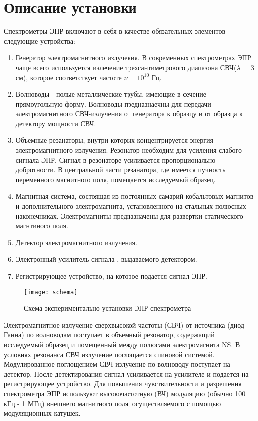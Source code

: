 \documentclass[a4paper,12pt]{article}
\begin{document}
	\section{Описание установки}
	
	Спектрометры ЭПР включают в себя в качестве обязательных элементов следующие устройства:

	\begin{enumerate}
	\item Генератор электромагнитного излучения. В современных спектрометрах ЭПР чаще всего используется излечение трехсантиметрового диапазона СВЧ($\lambda$ = 3 см), которое соответствует частоте $\nu$ = $10^{10}$ Гц.
	\item Волноводы - полые металлические трубы, имеющие в сечение прямоугольную форму. Волноводы предназнаечны для передачи электромагнитного СВЧ-излучения от генератора к образцу и от образца к детектору мощности СВЧ. 
	\item Объемные резанаторы, внутри которых концентрируется энергия электромагнитного излучения. Резонатор  необходим  для  усиления  слабого  сигнала  ЭПР.  Сигнал  в резонаторе  усиливается  пропорционально  добротности. В центральной части резанатора, где имеется пучность переменного магнитного поля, помещается исследуемый образец. 
	\item Магнитная система, состоящая из постоянных самарий-кобальтовых магнитов  и дополнительного электромагнита, установленного на стальных полюсных наконечниках. Электромагниты предназначены для развертки статического магнтиного поля. 
	\item Детектор электромагнитного излучения.
	\item Электронный усилитель сигнала , выдаваемого детектором.
	\item Регистрирующее устройство, на которое подается сигнал ЭПР. 
	\end{enumerate}
	
	\begin{figure}[h!]
		\begin{center}
			\texttt{[image: schema]}
			\caption{Схема экспериментально установки ЭПР-спектрометра}
		\end{center}
	\end{figure}
	
	
	Электромагнитное излучение сверхвысокой частоты (СВЧ) от источника (диод Ганна) по волноводам поступает в объемный резонатор, содержащий исследуемый образец и помещенный между полюсами электромагнита NS. В условиях резонанса СВЧ излучение поглощается спиновой системой. Модулированное поглощением СВЧ излучение по волноводу поступает на детектор. После детектирования сигнал усиливается на усилителе и подается на регистрирующее устройство.   Для повышения чувствительности и разрешения спектрометра ЭПР используют высокочастотную (ВЧ) модуляцию (обычно 100 кГц - 1 МГц) внешнего магнитного поля, осуществляемого с помощью модуляционных катушек. 
\end{document}
